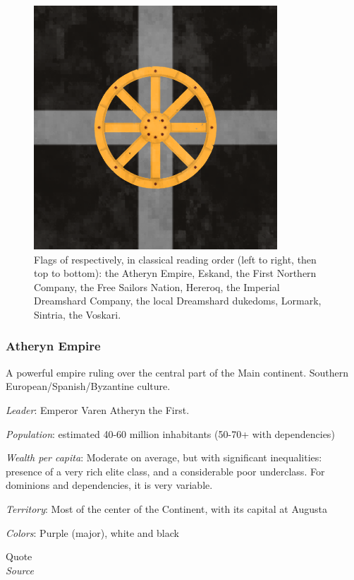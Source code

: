 \begin{figure}[!ht]
        \includegraphics[scale=0.25]{img/flag/voskari.png}

    \caption{Flags of respectively, in classical reading order (left to right, then top to bottom): the Atheryn Empire, Eskand, the First Northern Company, the Free Sailors Nation, Hereroq, the Imperial Dreamshard Company, the local Dreamshard dukedoms, Lormark, Sintria, the Voskari.}
    \label{flags}
\end{figure}



\subsubsection{Atheryn Empire}


A powerful empire ruling over the central part of the Main continent. Southern European/Spanish/Byzantine culture. 


\textit{Leader}: Emperor Varen Atheryn the First.

\textit{Population}: estimated 40-60 million inhabitants (50-70+ with dependencies)

\textit{Wealth per capita}: Moderate on average, but with significant inequalities: presence of a very rich elite class, and a considerable poor underclass. For dominions and dependencies, it is very variable.

\textit{Territory}: Most of the center of the Continent, with its capital at Augusta
    
\textit{Colors}: Purple (major), white and black


\begin{rpg-quotebox}
Quote \\ \textendash \textit{Source}
\end{rpg-quotebox}


